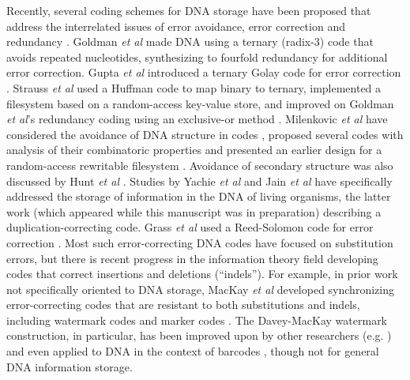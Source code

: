 \documentclass[english]{article}
\begin{document}
Recently, several coding schemes for DNA storage have been proposed
that address the interrelated issues of error avoidance, error correction and redundancy
\cite{GoldmanEtAl2013,MilenkovicEtAl2005,YachieEtAl2008,YazdiEtAl2015,GuptaEtAl2015,MilenkovicEtAl2014,MilenkovicEtAl2015,GabrysEtAl2015,HuntEtAl2015,JainEtAl2016,MilenkovicEtAl2016,BornholtEtAl2016}.
Goldman {\em et al} \cite{GoldmanEtAl2013} made DNA using a ternary (radix-3) code that avoids repeated nucleotides,
synthesizing to fourfold redundancy for additional error correction.
Gupta {\em et al} introduced a ternary Golay code for error correction \cite{GuptaEtAl2015}.
Strauss {\em et al} used a Huffman code to map binary to ternary,
implemented a filesystem based on a random-access key-value store,
and improved on Goldman {\em et al}'s redundancy coding using an exclusive-or method \cite{BornholtEtAl2016}.
Milenkovic {\em et al} have considered
the avoidance of DNA structure in codes \cite{MilenkovicEtAl2005},
proposed several codes with analysis of their combinatoric properties \cite{MilenkovicEtAl2014,MilenkovicEtAl2015,GabrysEtAl2015,MilenkovicEtAl2016}
and presented an earlier design for a random-access rewritable filesystem \cite{YazdiEtAl2015}.
Avoidance of secondary structure was also discussed by Hunt {\em et al} \cite{HuntEtAl2015}.
Studies by Yachie {\em et al} \cite{YachieEtAl2008} and Jain {\em et al} \cite{JainEtAl2016}
have specifically addressed the storage of information in the DNA of living organisms,
the latter work (which appeared while this manuscript was in preparation) describing a duplication-correcting code.
Grass {\em et al} used a Reed-Solomon code for error correction \cite{GrassEtAl2015}.
Most such error-correcting DNA codes have focused on substitution errors, but there is recent
progress in the information theory field developing codes that correct insertions and deletions (``indels'').
For example, in prior work not specifically oriented to DNA storage,
MacKay {\em et al} developed synchronizing error-correcting codes that are resistant to
both substitutions and indels,
including watermark codes \cite{DaveyMackay2000,DaveyMackay2001}
and marker codes \cite{RatzerMackay2000}.
The Davey-MacKay watermark construction, in particular,
has been improved upon by other researchers (e.g. \cite{BriffaEtAl2010,JiaoEtAl2012,NguyenEtAl2013})
and even applied to DNA in the context of barcodes \cite{KrachtSchober2015},
though not for general DNA information storage.
\end{document}
